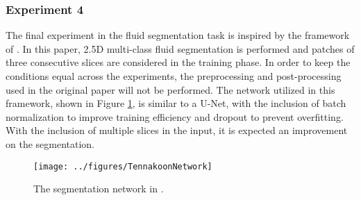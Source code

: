\subsubsection{Experiment 4}\label{Experiment4}
The final experiment in the fluid segmentation task is inspired by the framework of \textcite{Tennakoon2018}. In this paper, 2.5D multi-class fluid segmentation is performed and patches of three consecutive slices are considered in the training phase. In order to keep the conditions equal across the experiments, the preprocessing and post-processing used in the original paper will not be performed. The network utilized in this framework, shown in Figure \ref{fig:TennakoonNetwork}, is similar to a U-Net, with the inclusion of batch normalization to improve training efficiency and dropout to prevent overfitting. With the inclusion of multiple slices in the input, it is expected an improvement on the segmentation.

\begin{figure}[!ht]
	\centering
	\texttt{[image: ../figures/TennakoonNetwork]}
	\caption{The segmentation network in \cite{Tennakoon2018}.}
	\label{fig:TennakoonNetwork}
\end{figure}

